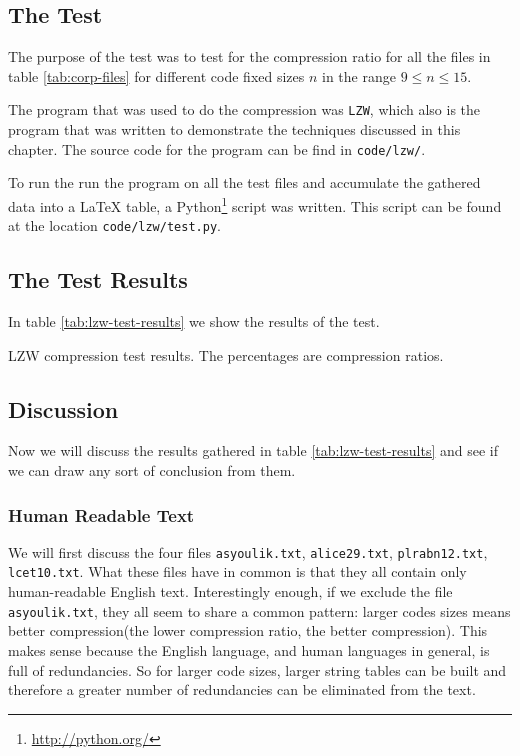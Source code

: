\subsection{The Test}

The purpose of the test was to test for the compression ratio for all
the files in table \ref{tab:corp-files} for different code fixed sizes
$n$ in the range $9 \leq n \leq 15$.

The program that was used to do the compression was \verb|LZW|, which
also is the program that was written to demonstrate the techniques
discussed in this chapter. The source code for the program can be find
in \verb|code/lzw/|.

To run the run the program on all the test files and accumulate the
gathered data into a \LaTeX{} table, a Python\footnote{\url{http://python.org/}} script was written. This
script can be found at the location \verb|code/lzw/test.py|.

\subsection{The Test Results}

In table \ref{tab:lzw-test-results} we show the results of the test.

\begin{table}
  \scriptsize
  \centering
  
  \caption{LZW compression test results. The percentages are compression ratios.}
  \label{tab:lzw-test-results}
\end{table}

\subsection{Discussion}

Now we will discuss the results gathered in table
\ref{tab:lzw-test-results} and see if we can draw any sort of
conclusion from them.

\subsubsection{Human Readable Text}

We will first discuss the four files \verb|asyoulik.txt|,
\verb|alice29.txt|, \verb|plrabn12.txt|, \verb|lcet10.txt|. What these
files have in common is that they all contain only human-readable
English text. Interestingly enough, if we exclude the file
\verb|asyoulik.txt|, they all seem to share a common pattern: larger
codes sizes means better compression(the lower compression ratio, the
better compression). This makes sense because the English language,
and human languages in general, is full of redundancies. So for larger
code sizes, larger string tables can be built and therefore a greater
number of redundancies can be eliminated from the text.

